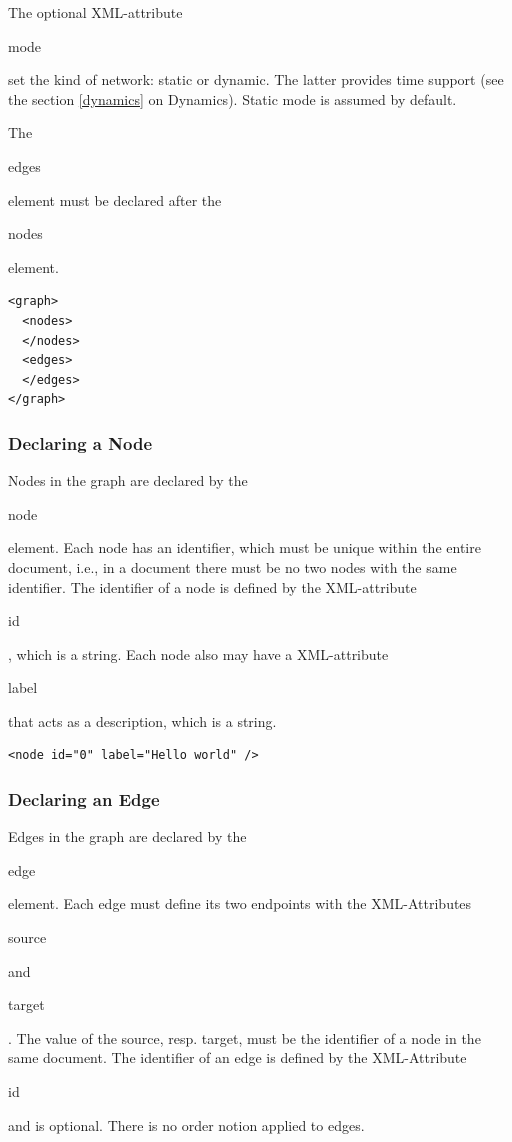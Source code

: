\documentclass[a4paper,10pt]{article}
\begin{document}
The optional XML-attribute \begin{footnotesize}mode\end{footnotesize} set the kind of network: static or dynamic. The latter provides time support (see  the section \ref{dynamics} on Dynamics). Static mode is assumed by default.

The \begin{footnotesize}edges\end{footnotesize} element must be declared after the \begin{footnotesize}nodes\end{footnotesize} element.

\lstset{ style=gexf }
\begin{lstlisting}[caption={An empty graph!},label=aGraph]
<graph>
  <nodes>
  </nodes>
  <edges>
  </edges>
</graph>
\end{lstlisting}

\subsubsection{Declaring a Node}

Nodes in the graph are declared by the \begin{footnotesize}node\end{footnotesize} element. Each node has an identifier, which must be unique within the entire document, i.e., in a document there must be no two nodes with the same identifier. The identifier of a node is defined by the XML-attribute \begin{footnotesize}id\end{footnotesize}, which is a string. Each node also may have a XML-attribute \begin{footnotesize}label\end{footnotesize} that acts as a description, which is a string.

\lstset{ style=gexf }
\begin{lstlisting}[caption={A node!},label=aNode]
<node id="0" label="Hello world" />
\end{lstlisting}

\subsubsection{Declaring an Edge}

Edges in the graph are declared by the \begin{footnotesize}edge\end{footnotesize} element. Each edge must define its two endpoints with the XML-Attributes \begin{footnotesize}source\end{footnotesize} and \begin{footnotesize}target\end{footnotesize}. The value of the source, resp. target, must be the identifier of a node in the same document. The identifier of an edge is defined by the XML-Attribute \begin{footnotesize}id\end{footnotesize} and is optional. There is no order notion applied to edges.
\end{document}
